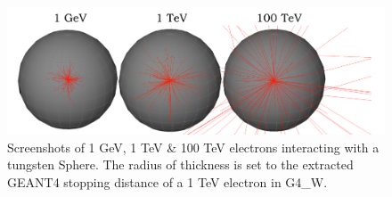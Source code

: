 \documentclass[12pt,a4paper]{article}
\begin{document}
\begin{figure}[h!]
\hspace*{1.4cm}\includegraphics[scale=0.5]{Images//BDSIM//Tungsten_Sphere.png}
\caption[width=\columnwidth]{Screenshots of 1 GeV, 1 TeV \& 100 TeV electrons interacting with a tungsten Sphere. The radius of thickness is set to the extracted GEANT4 stopping distance of a 1 TeV electron in G4\_W.}
\label{tung}
\end{figure}
\end{document}
